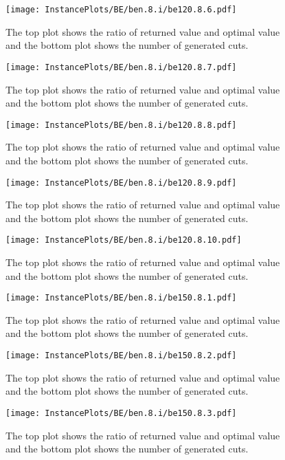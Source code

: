 \documentclass[10pt,a4paper]{article}
\begin{document}
\begin{figure}[H]
\texttt{[image: InstancePlots/BE/ben.8.i/be120.8.6.pdf]}
\caption{The top plot shows the ratio of returned value and optimal value     and the bottom plot shows the number of generated cuts.}
\end{figure}

\begin{figure}[H]
\texttt{[image: InstancePlots/BE/ben.8.i/be120.8.7.pdf]}
\caption{The top plot shows the ratio of returned value and optimal value     and the bottom plot shows the number of generated cuts.}
\end{figure}

\begin{figure}[H]
\texttt{[image: InstancePlots/BE/ben.8.i/be120.8.8.pdf]}
\caption{The top plot shows the ratio of returned value and optimal value     and the bottom plot shows the number of generated cuts.}
\end{figure}

\begin{figure}[H]
\texttt{[image: InstancePlots/BE/ben.8.i/be120.8.9.pdf]}
\caption{The top plot shows the ratio of returned value and optimal value     and the bottom plot shows the number of generated cuts.}
\end{figure}

\begin{figure}[H]
\texttt{[image: InstancePlots/BE/ben.8.i/be120.8.10.pdf]}
\caption{The top plot shows the ratio of returned value and optimal value     and the bottom plot shows the number of generated cuts.}
\end{figure}

\begin{figure}[H]
\texttt{[image: InstancePlots/BE/ben.8.i/be150.8.1.pdf]}
\caption{The top plot shows the ratio of returned value and optimal value     and the bottom plot shows the number of generated cuts.}
\end{figure}

\begin{figure}[H]
\texttt{[image: InstancePlots/BE/ben.8.i/be150.8.2.pdf]}
\caption{The top plot shows the ratio of returned value and optimal value     and the bottom plot shows the number of generated cuts.}
\end{figure}

\begin{figure}[H]
\texttt{[image: InstancePlots/BE/ben.8.i/be150.8.3.pdf]}
\caption{The top plot shows the ratio of returned value and optimal value     and the bottom plot shows the number of generated cuts.}
\end{figure}
\end{document}
